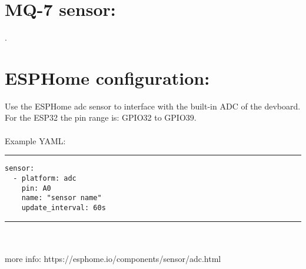 \documentclass{article}
\begin{document}
\section*{MQ-7 sensor:}
.

\section*{ESPHome configuration:} 
Use the ESPHome adc sensor to interface with the built-in ADC of the devboard.
For the ESP32 the pin range is: GPIO32 to GPIO39.\\\\

Example YAML:\\
{\color{Gray} \rule{\linewidth}{0.6mm} }

\begin{verbatim}
sensor:
  - platform: adc
    pin: A0
    name: "sensor name"
    update_interval: 60s
\end{verbatim}
{\color{Gray} \rule{\linewidth}{0.6mm} }\\\\
more info: https://esphome.io/components/sensor/adc.html
\end{document}
